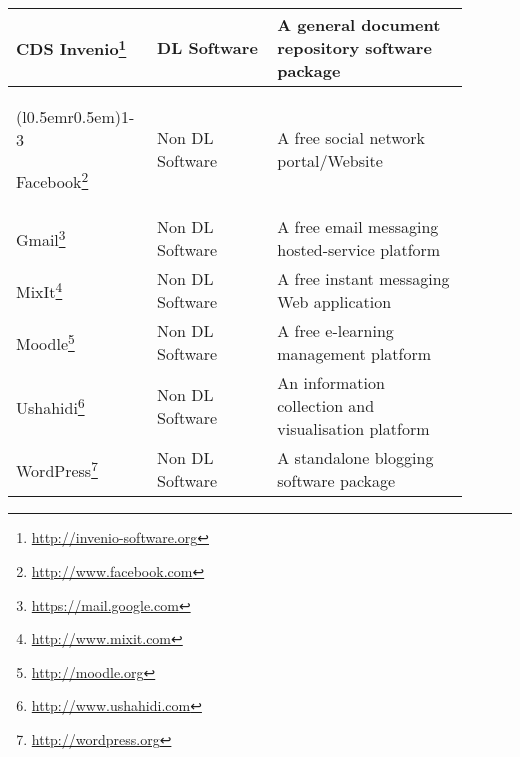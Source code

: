 \begin{longtable}{p{0.25\linewidth} p{0.25\linewidth} p{0.4\linewidth}}

 {CDS Invenio\footnote{\url{http://invenio-software.org}}\index{Digital Libraries!Software!CDS Invenio}}&
 {DL Software}&
 {A general document repository software package}\\

 \cmidrule[0.1pt](l{0.5em}r{0.5em}){1-3}

 {Facebook\footnote{\url{http://www.facebook.com}}\index{Facebook}}&
 {Non DL Software}&
 {A free social network portal/Website}\\


 {Gmail\footnote{\url{https://mail.google.com}}\index{Gmail}}&
 {Non DL Software}&
 {A free email messaging hosted-service platform}\\


 {MixIt\footnote{\url{http://www.mixit.com}}\index{MixIt}}&
 {Non DL Software}&
 {A free instant messaging Web application}\\


 {Moodle\footnote{\url{http://moodle.org}}\index{Moodle}}&
 {Non DL Software}&
 {A free e-learning management platform}\\


 {Ushahidi\footnote{\url{http://www.ushahidi.com}}\index{Ushahidi}}&
 {Non DL Software}&
 {An information collection and visualisation platform}\\


 {WordPress\footnote{\url{http://wordpress.org}}\index{WordPress}}&
 {Non DL Software}&
 {A standalone blogging software package}\\

 \end{longtable}
